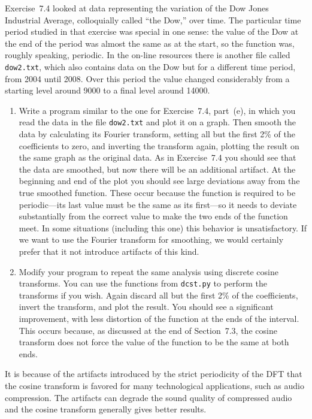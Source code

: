 \documentclass[12pt]{article}
\begin{document}
\begin{exercises}
Exercise~7.4 looked at data representing the variation of the Dow Jones
Industrial Average, colloquially called ``the Dow,'' over time.  The
particular time period studied in that exercise was special in one sense:
the value of the Dow at the end of the period was almost the same as at the
start, so the function was, roughly speaking, periodic.  In the on-line
resources there is another file called \verb|dow2.txt|, which also contains
data on the Dow but for a different time period, from 2004 until 2008.
Over this period the value changed considerably from a starting level
around 9000 to a final level around 14000.
\begin{enumerate}\setlength{\itemsep}{0pt}
\item Write a program similar to the one for Exercise~7.4, part~(e), in
  which you read the data in the file \verb|dow2.txt| and plot it on a
  graph.  Then smooth the data by calculating its Fourier transform,
  setting all but the first 2\% of the coefficients to zero, and inverting
  the transform again, plotting the result on the same graph as the
  original data.  As in Exercise~7.4 you should see that the data are
  smoothed, but now there will be an additional artifact.  At the beginning
  and end of the plot you should see large deviations away from the true
  smoothed function.  These occur because the function is required to be
  periodic---its last value must be the same as its first---so it needs to
  deviate substantially from the correct value to make the two ends of the
  function meet.  In some situations (including this one) this behavior is
  unsatisfactory.  If we want to use the Fourier transform for smoothing,
  we would certainly prefer that it not introduce artifacts of this kind.
\item Modify your program to repeat the same analysis using discrete cosine
  transforms.  You can use the functions from \verb|dcst.py| to perform the
  transforms if you wish.  Again discard all but the first 2\% of the
  coefficients, invert the transform, and plot the result.  You should see
  a significant improvement, with less distortion of the function at the
  ends of the interval.  This occurs because, as discussed at the end of
  Section~7.3, the cosine transform does not force the value of the
  function to be the same at both ends.
\end{enumerate}
It is because of the artifacts introduced by the strict periodicity
of the DFT that the cosine transform is favored for many technological
applications, such as audio compression.  The artifacts can degrade the
sound quality of compressed audio and the cosine transform generally gives
better results.


\end{exercises}
\end{document}
